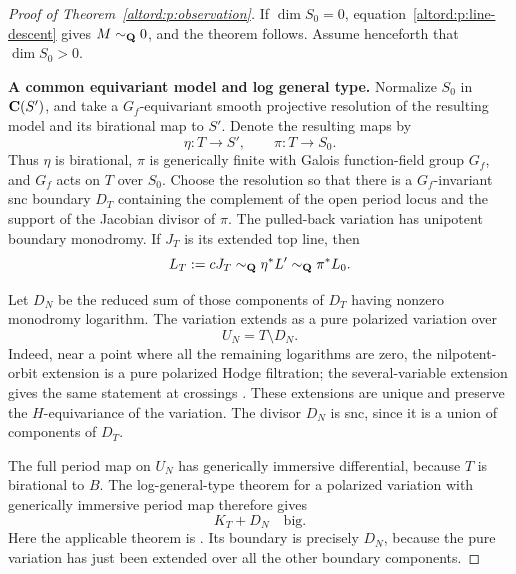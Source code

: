 \begin{proof}[Proof of Theorem~\ref{altord:p:observation}]
If $\dim S_0=0$, equation~\eqref{altord:p:line-descent} gives
$M\sim_{\mathbf Q}0$, and the theorem follows.  Assume henceforth that
$\dim S_0>0$.

\medskip\noindent
\textbf{A common equivariant model and log general type.}
Normalize $S_0$ in $\mathbf C(S')$, and take a $G_f$-equivariant smooth
projective resolution of the resulting model and its birational map
to $S'$.  Denote the resulting maps by
\[
  \eta:T\longrightarrow S',\qquad
  \pi:T\longrightarrow S_0.
\]
Thus $\eta$ is birational, $\pi$ is generically finite with Galois
function-field group $G_f$, and $G_f$ acts on $T$ over $S_0$.
Choose the resolution so that there is a $G_f$-invariant snc boundary
$D_T$ containing the complement of the open period locus and the
support of the Jacobian divisor of $\pi$.  The pulled-back variation
has unipotent boundary monodromy.  If $J_T$ is its extended top line,
then
\begin{equation}
  L_T:=cJ_T\sim_{\mathbf Q}\eta^*L'
     \sim_{\mathbf Q}\pi^*L_0.
  \label{altord:p:T-line}
\end{equation}

Let $D_N$ be the reduced sum of those components of $D_T$ having
nonzero monodromy logarithm.  The variation extends as a pure polarized
variation over
\[
  U_N=T\setminus D_N.
\]
Indeed, near a point where all the remaining logarithms are zero, the
nilpotent-orbit extension is a pure polarized Hodge filtration; the
several-variable extension gives the same statement at crossings
\cite{Schmid,CKS}.  These extensions are unique and preserve the
$H$-equivariance of the variation.  The divisor $D_N$ is snc, since it
is a union of components of $D_T$.

The full period map on $U_N$ has generically immersive differential,
because $T$ is birational to $B$.  The log-general-type theorem for a
polarized variation with generically immersive period map therefore
gives
\begin{equation}
  K_T+D_N\quad\text{big}.
  \label{altord:p:log-big}
\end{equation}
Here the applicable theorem is \cite[Theorem~1.1]{BrunebarbeCadorel}.  Its boundary is precisely
$D_N$, because the pure variation has just been extended over all the
other boundary components.


\end{proof}
